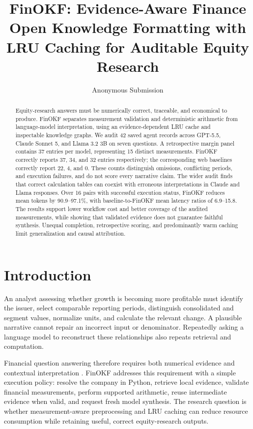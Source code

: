 \documentclass[letterpaper]{article} %
\title{FinOKF: Evidence-Aware Finance Open Knowledge Formatting with LRU Caching for Auditable Equity Research}
\author{Anonymous Submission}
\begin{document}
\maketitle

\begin{abstract}
Equity-research answers must be numerically correct, traceable, and economical to produce. FinOKF separates measurement validation and deterministic arithmetic from language-model interpretation, using an evidence-dependent LRU cache and inspectable knowledge graphs. We audit 42 saved agent records across GPT-5.5, Claude Sonnet 5, and Llama 3.2 3B on seven questions. A retrospective margin panel contains 37 entries per model, representing 15 distinct measurements. FinOKF correctly reports 37, 34, and 32 entries respectively; the corresponding web baselines correctly report 22, 4, and 0. These counts distinguish omissions, conflicting periods, and execution failures, and do not score every narrative claim. The wider audit finds that correct calculation tables can coexist with erroneous interpretations in Claude and Llama responses. Over 16 pairs with successful execution status, FinOKF reduces mean tokens by 90.9--97.1\%, with baseline-to-FinOKF mean latency ratios of 6.9--15.8. The results support lower workflow cost and better coverage of the audited measurements, while showing that validated evidence does not guarantee faithful synthesis. Unequal completion, retrospective scoring, and predominantly warm caching limit generalization and causal attribution.
\end{abstract}

\section{Introduction}
An analyst assessing whether growth is becoming more profitable must identify the issuer, select comparable reporting periods, distinguish consolidated and segment values, normalize units, and calculate the relevant change. A plausible narrative cannot repair an incorrect input or denominator. Repeatedly asking a language model to reconstruct these relationships also repeats retrieval and computation.

Financial question answering therefore requires both numerical evidence and contextual interpretation \citep{chen2021finqa,zhu2021tatqa}. FinOKF addresses this requirement with a simple execution policy: resolve the company in Python, retrieve local evidence, validate financial measurements, perform supported arithmetic, reuse intermediate evidence when valid, and request fresh model synthesis. The research question is whether measurement-aware preprocessing and LRU caching can reduce resource consumption while retaining useful, correct equity-research outputs.
\end{document}
